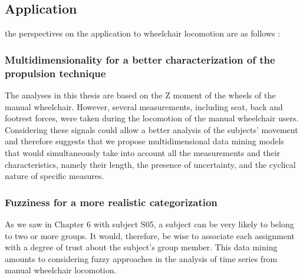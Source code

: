 \subsection*{Application}

the perspectives on the application to wheelchair locomotion are as follows : 

\subsubsection*{Multidimensionality for a better characterization of the propulsion technique}
The analyses in this thesis are based on the Z moment of the wheels of the manual wheelchair. However, several measurements, including seat, back and footrest forces, were taken during the locomotion of the manual wheelchair users. Considering these signals could allow a better analysis of the subjects' movement and therefore suggests that we propose multidimensional data mining models that would simultaneously take into account all the measurements and their characteristics, namely their length, the presence of uncertainty, and the cyclical nature of specific measures.
\subsubsection*{Fuzziness for a more realistic categorization}
As we saw in Chapter 6 with subject S05, a subject can be very likely to belong to two or more groups. It would, therefore, be wise to associate each assignment with a degree of trust about the subject's group member. This data mining amounts to considering fuzzy approaches in the analysis of time series from manual wheelchair locomotion.